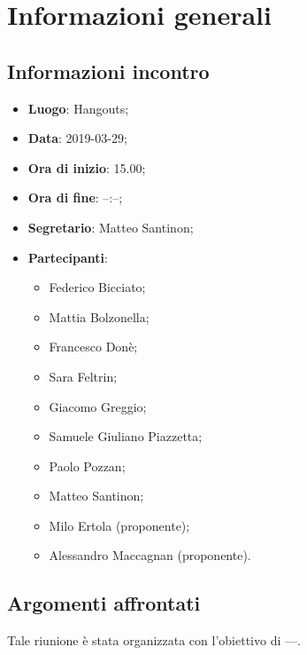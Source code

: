 \section{Informazioni generali}

\subsection{Informazioni incontro}
\begin{itemize}
\item \textbf{Luogo}: Hangouts;
\item \textbf{Data}: 2019-03-29;
\item \textbf{Ora di inizio}: 15.00;
\item \textbf{Ora di fine}: --:--;
\item \textbf{Segretario}: Matteo Santinon;
\item \textbf{Partecipanti}: 
\begin{itemize}
	\item Federico Bicciato;
	\item Mattia Bolzonella;
	\item Francesco Donè;
	\item Sara Feltrin;
	\item Giacomo Greggio;
	\item Samuele Giuliano Piazzetta;
	\item Paolo Pozzan;
	\item Matteo Santinon;
	\item Milo Ertola (proponente);
	\item Alessandro Maccagnan (proponente).
\end{itemize}
\end{itemize}

\subsection{Argomenti affrontati}
Tale riunione è stata organizzata con l'obiettivo di ---.

